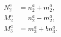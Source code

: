 \begin{equation}
\begin{aligned}
N^a_2 &= n^a_2+m^a_2,\\
M^a_2 &= n^a_2-m^a_2,\\
M^a_3 &= m^a_3+bn^a_3.
\end{aligned}\label{EqWrappingAbb}
\end{equation}

